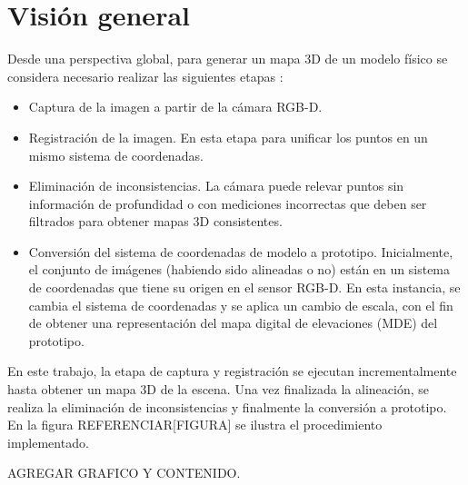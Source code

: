 \chapter{Visión general}

Desde una perspectiva global, para generar un mapa 3D de un modelo físico se considera necesario realizar las siguientes etapas :
\begin{itemize}

\item Captura de la imagen a partir de la cámara RGB-D.

\item Registración de la imagen. En esta etapa para unificar los puntos en un mismo sistema de coordenadas.

\item Eliminación de inconsistencias. La cámara puede relevar puntos sin información de profundidad o con mediciones incorrectas que deben ser filtrados para obtener mapas 3D consistentes. 

\item Conversión del sistema de coordenadas de modelo a prototipo. Inicialmente, el conjunto de imágenes (habiendo sido alineadas o no) están en un sistema de coordenadas que tiene su origen en el sensor RGB-D. En esta instancia, se cambia el sistema de coordenadas y se aplica un cambio de escala, con el fin de obtener una representación del mapa digital de elevaciones (MDE) del prototipo.

\end{itemize}

En este trabajo, la etapa de captura y registración se ejecutan incrementalmente hasta obtener un mapa 3D de la escena. Una vez finalizada la alineación, se realiza la eliminación de inconsistencias y finalmente la conversión a prototipo. En la figura REFERENCIAR[FIGURA] se ilustra el procedimiento implementado.

AGREGAR GRAFICO Y CONTENIDO.

